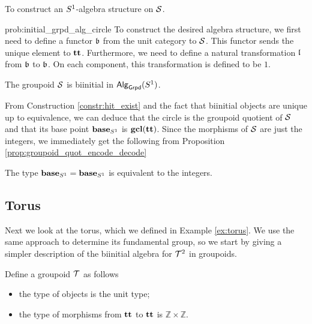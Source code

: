 \begin{problem}
\label{prob:initial_grpd_alg_circle}
To construct an $S^1$-algebra structure on $\mathcal{S}$.
\end{problem}

\begin{construction}{prob:initial_grpd_alg_circle}
To construct the desired algebra structure, we first need to define a functor $\mathfrak{b}$ from the unit category to $\mathcal{S}$.
This functor sends the unique element to $\operatorname{\mathbf{tt}}$.
Furthermore, we need to define a natural transformation $\mathfrak{l}$ from $\mathfrak{b}$ to $\mathfrak{b}$.
On each component, this transformation is defined to be $1$.
\end{construction}

\begin{proposition}
The groupoid $\mathcal{S}$ is biinitial in $\mathsf{Alg}_{\mathsf{Grpd}}(S^1)$.
\end{proposition}

From Construction \ref{constr:hit_exist} and the fact that biinitial objects are unique up to equivalence,
we can deduce that the circle is the groupoid quotient of $\mathcal{S}$ and that its base point $\operatorname{\mathbf{base}}_{S^1}$ is $\operatorname{\mathbf{gcl}}(\operatorname{\mathbf{tt}})$.
Since the morphisms of $\mathcal{S}$ are just the integers, we immediately get the following from Proposition \ref{prop:groupoid_quot_encode_decode}

\begin{corollary}
The type $\operatorname{\mathbf{base}}_{S^1} = \operatorname{\mathbf{base}}_{S^1}$ is equivalent to the integers.
\end{corollary}

\subsection{Torus}
\label{sec:torus_fund_group}
Next we look at the torus, which we defined in Example \ref{ex:torus}.
We use the same approach to determine its fundamental group, so we start by giving a simpler description of the biinitial algebra for $\mathcal{T}^2$ in groupoids.

\begin{definition}
Define a groupoid $\mathcal{T}$ as follows
\begin{itemize}
	\item the type of objects is the unit type;
	\item the type of morphisms from $\operatorname{\mathbf{tt}}$ to $\operatorname{\mathbf{tt}}$ is $\mathbb{Z} \times \mathbb{Z}$.
\end{itemize}
\end{definition}


